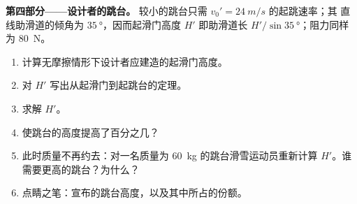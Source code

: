 \begin{problem}
\medskip\noindent\textbf{第四部分——设计者的跳台。}
较小的跳台只需 $v_0' = \qty{24}{m/s}$ 的起跳速率；其
直线助滑道的倾角为 $\qty{35}{\degree}$，因而起滑门高度 $H'$
即助滑道长 $H'/\sin\qty{35}{\degree}$；阻力同样为 \qty{80}{N}。
\begin{enumerate}[resume]
  \item 计算无摩擦情形下设计者应建造的起滑门高度。
  \item 对 $H'$ 写出从起滑门到起跳台的定理。
  \item 求解 $H'$。
  \item {}使跳台的高度提高了百分之几？
  \item 此时质量不再约去：对一名质量为
        \qty{60}{kg} 的跳台滑雪运动员重新计算 $H'$。谁需要更高的跳台？为什么？
  \item 点睛之笔：宣布的跳台高度，以及其中所占的份额。
\end{enumerate}
\end{problem}
